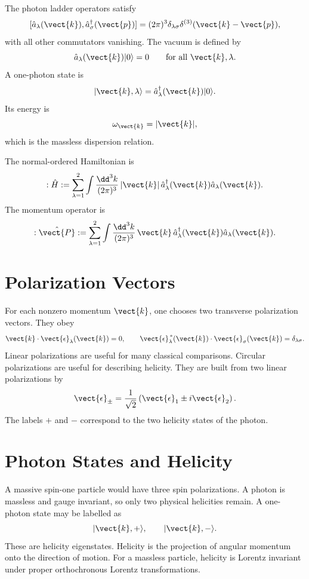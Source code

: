 The photon ladder operators satisfy
\[
    [\hat a_{\lambda}(\vect{k}),
     \hat a_{\sigma}^{\dagger}(\vect{p})]
    = (2\pi)^3\delta_{\lambda\sigma}
      \delta^{(3)}(\vect{k}-\vect{p}),
\]
with all other commutators vanishing. The vacuum is defined by
\[
    \hat a_{\lambda}(\vect{k})|0\rangle=0
    \qquad \text{for all }\vect{k},\lambda.
\]
A one-photon state is
\[
    |\vect{k},\lambda\rangle
    = \hat a_{\lambda}^{\dagger}(\vect{k})|0\rangle.
\]
Its energy is
\[
    \omega_{\vect{k}}=|\vect{k}|,
\]
which is the massless dispersion relation.

The normal-ordered Hamiltonian is
\[
    :\hat H:
    = \sum_{\lambda=1}^{2}
      \int\frac{\dd^3k}{(2\pi)^3}\,
      |\vect{k}|\,
      \hat a_{\lambda}^{\dagger}(\vect{k})
      \hat a_{\lambda}(\vect{k}).
\]
The momentum operator is
\[
    :\hat{\vect{P}}:
    = \sum_{\lambda=1}^{2}
      \int\frac{\dd^3k}{(2\pi)^3}\,
      \vect{k}\,
      \hat a_{\lambda}^{\dagger}(\vect{k})
      \hat a_{\lambda}(\vect{k}).
\]

\section{Polarization Vectors}

For each nonzero momentum \(\vect{k}\), one chooses two transverse polarization
vectors. They obey
\[
    \vect{k}\cdot\vect{\epsilon}_{\lambda}(\vect{k})=0,
    \qquad
    \vect{\epsilon}_{\lambda}^{\,*}(\vect{k})
    \cdot
    \vect{\epsilon}_{\sigma}(\vect{k})
    = \delta_{\lambda\sigma}.
\]
Linear polarizations are useful for many classical comparisons. Circular
polarizations are useful for describing helicity. They are built from two linear
polarizations by
\[
    \vect{\epsilon}_{\pm}
    = \frac{1}{\sqrt{2}}
      \left(\vect{\epsilon}_1\pm i\vect{\epsilon}_2\right).
\]
The labels \(+\) and \(-\) correspond to the two helicity states of the photon.

\section{Photon States and Helicity}

A massive spin-one particle would have three spin polarizations. A photon is
massless and gauge invariant, so only two physical helicities remain. A
one-photon state may be labelled as
\[
    |\vect{k},+\rangle,
    \qquad
    |\vect{k},-\rangle.
\]
These are helicity eigenstates. Helicity is the projection of angular momentum
onto the direction of motion. For a massless particle, helicity is Lorentz
invariant under proper orthochronous Lorentz transformations.

